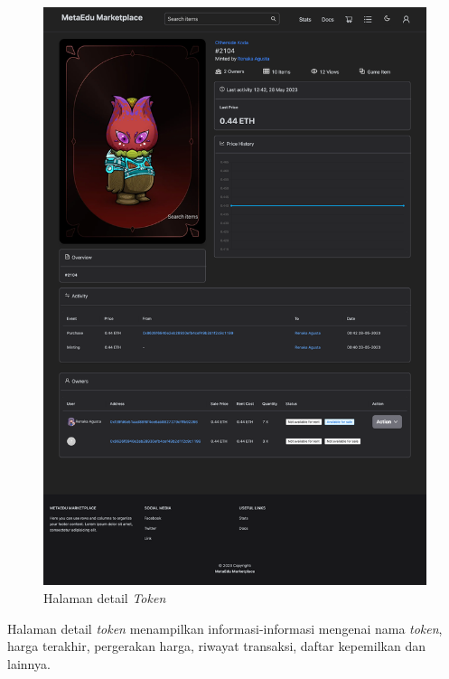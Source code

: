 \begin{figure} [H] \centering
  \includegraphics[scale=0.1]{gambar/img-frontend-token-detail.png}
  \caption{Halaman detail \emph{Token}}
  \label{fig:TokenDetail}
\end{figure}

Halaman detail \emph{token} menampilkan informasi-informasi mengenai nama \emph{token}, harga terakhir, pergerakan harga, riwayat transaksi, daftar kepemilkan dan lainnya. 

